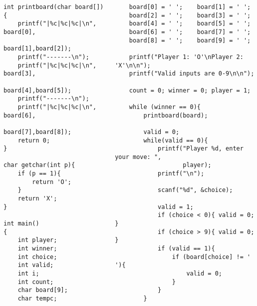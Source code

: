 \documentclass{plt}
\begin{document}
\begin{frame}[fragile]
\begin{columns}
\begin{column}{0.4\textwidth}
\fontsize{7pt}{7pt}\selectfont
\begin{verbatim}
int printboard(char board[]){
    printf("|%c|%c|%c|\n", board[0],
           board[1],board[2]);
    printf("-------\n");
    printf("|%c|%c|%c|\n", board[3],
           board[4],board[5]);
    printf("-------\n");
    printf("|%c|%c|%c|\n", board[6],
           board[7],board[8]);
    return 0;
}

char getchar(int p){
    if (p == 1){
        return 'O';
    }
    return 'X';
}

int main()
{
    int player;
    int winner;
    int choice;
    int valid;
    int i;
    int count;
    char board[9];
    char tempc;
\end{verbatim}
\end{column}
\begin{column}{0.6\textwidth}
\fontsize{7pt}{7pt}\selectfont
\begin{verbatim}
    board[0] = ' ';    board[1] = ' ';
    board[2] = ' ';    board[3] = ' ';
    board[4] = ' ';    board[5] = ' ';
    board[6] = ' ';    board[7] = ' ';
    board[8] = ' ';    board[9] = ' ';

    printf("Player 1: 'O'\nPlayer 2: 'X'\n\n");
    printf("Valid inputs are 0-9\n\n");

    count = 0; winner = 0; player = 1;

    while (winner == 0){
        printboard(board);

        valid = 0;
        while(valid == 0){
            printf("Player %d, enter your move: ",
                   player);
            printf("\n");

            scanf("%d", &choice);

            valid = 1;
            if (choice < 0){ valid = 0; }
            if (choice > 9){ valid = 0; }
            if (valid == 1){ 
                if (board[choice] != ' '){
                    valid = 0;
                }
            }
        }
\end{verbatim}
\end{column}
\end{columns}

\end{frame}
\end{document}
